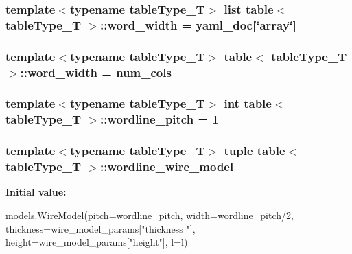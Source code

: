 \label{classtable_a26f8b3354769a96a7c51206b89d2a95e}
\hypertarget{classtable_aceb89bcee9f344f99b75379e82506882}{
\subsubsection[{word\_\-width}]{\setlength{\rightskip}{0pt plus 5cm}template$<$typename tableType\_\-T$>$ list {\bf table}$<$ tableType\_\-T $>$::{\bf word\_\-width} = {\bf yaml\_\-doc}\mbox{[}\char`\"{}array\char`\"{}\mbox{]}}}
\label{classtable_aceb89bcee9f344f99b75379e82506882}
\hypertarget{classtable_a82c0fbf4821eb05c66c0624547812497}{
\subsubsection[{word\_\-width}]{\setlength{\rightskip}{0pt plus 5cm}template$<$typename tableType\_\-T$>$ {\bf table}$<$ tableType\_\-T $>$::{\bf word\_\-width} = {\bf num\_\-cols}}}
\label{classtable_a82c0fbf4821eb05c66c0624547812497}
\hypertarget{classtable_a815376b65b49c50ba7ed9c5ced5ca4a4}{
\subsubsection[{wordline\_\-pitch}]{\setlength{\rightskip}{0pt plus 5cm}template$<$typename tableType\_\-T$>$ int {\bf table}$<$ tableType\_\-T $>$::{\bf wordline\_\-pitch} = 1}}
\label{classtable_a815376b65b49c50ba7ed9c5ced5ca4a4}
\hypertarget{classtable_a5c3be16096865c6c55cfb6eebaad2cee}{
\subsubsection[{wordline\_\-wire\_\-model}]{\setlength{\rightskip}{0pt plus 5cm}template$<$typename tableType\_\-T$>$ tuple {\bf table}$<$ tableType\_\-T $>$::{\bf wordline\_\-wire\_\-model}}}
\label{classtable_a5c3be16096865c6c55cfb6eebaad2cee}
{\bfseries Initial value:}
\begin{DoxyCode}
models.WireModel(pitch=wordline_pitch,
                                           width=wordline_pitch/2,
                                           thickness=wire_model_params["thickness
      "],
                                           height=wire_model_params["height"],
                                           l=l)
\end{DoxyCode}
